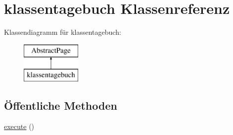 \hypertarget{classklassentagebuch}{}\section{klassentagebuch Klassenreferenz}
\label{classklassentagebuch}
Klassendiagramm für klassentagebuch\+:\begin{figure}[H]
\begin{center}
\leavevmode
\includegraphics[height=2.000000cm]{classklassentagebuch}
\end{center}
\end{figure}
\subsection*{Öffentliche Methoden}
\begin{DoxyCompactItemize}
\item 
\mbox{\hyperlink{classklassentagebuch_aa4700b2a423608c1856d30dce8725964}{execute}} ()
\end{DoxyCompactItemize}
